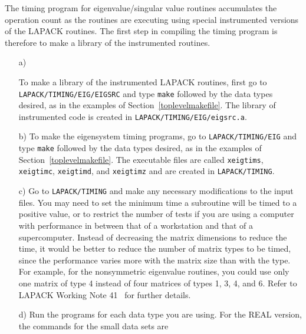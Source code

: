 \documentclass[11pt]{report}
\begin{document}
The timing program for eigenvalue/singular value routines accumulates
the operation count as the routines are executing using special
instrumented versions of the LAPACK routines.  The first step in
compiling the timing program is therefore to make a library of the
instrumented routines.

\begin{itemize}
\item[a)]
\begin{sloppypar}
To make a library of the instrumented LAPACK routines, first
go to \texttt{LAPACK/TIMING/EIG/EIGSRC} and type \texttt{make} followed
by the data types desired, as in the examples of Section~\ref{toplevelmakefile}.
The library of instrumented code is created in
\texttt{LAPACK/TIMING/EIG/eigsrc.a}.
\end{sloppypar}

\item[b)]
To make the eigensystem timing programs,
go to \texttt{LAPACK/TIMING/EIG} and
type \texttt{make} followed by the data types desired, as in the examples
of Section~\ref{toplevelmakefile}.  The executable files are called
\texttt{xeigtims}, \texttt{xeigtimc}, \texttt{xeigtimd}, and \texttt{xeigtimz}
and are created in \texttt{LAPACK/TIMING}.

\item[c)]
Go to \texttt{LAPACK/TIMING} and
make any necessary modifications to the input files.
You may need to set the minimum time a subroutine will
be timed to a positive value, or to restrict the number of tests
if you are using a computer with performance in between that of a
workstation and that of a supercomputer.
Instead of decreasing the matrix dimensions to reduce the time,
it would be better to reduce the number of matrix types to be timed,
since the performance varies more with the matrix size than with the
type.  For example, for the nonsymmetric eigenvalue routines,
you could use only one matrix of type 4 instead of four matrices of
types 1, 3, 4, and 6.
Refer to LAPACK Working Note 41~\cite{WN41} for further details.

\item[d)]
Run the programs for each data type you are using.
For the REAL version, the commands for the small data sets are


\end{itemize}
\end{document}

